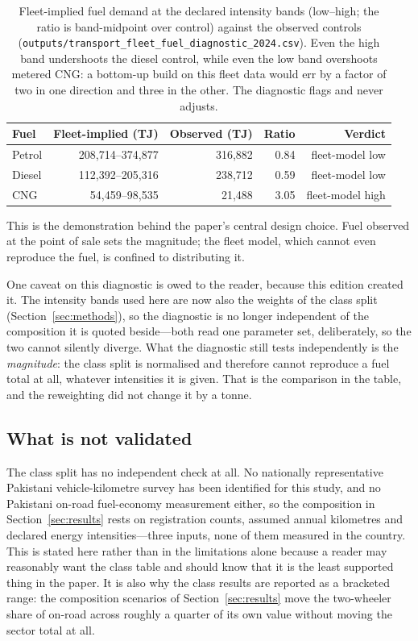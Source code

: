 \begin{table}[htbp]
\centering
\footnotesize
\begin{tabular}{@{}lrrrr@{}}
\toprule
\textbf{Fuel} & \textbf{Fleet-implied (TJ)} & \textbf{Observed (TJ)} &
\textbf{Ratio} & \textbf{Verdict} \\
\midrule
Petrol & 208,714--374,877 & 316,882 & 0.84 & fleet-model low \\
Diesel & 112,392--205,316 & 238,712 & 0.59 & fleet-model low \\
CNG    & 54,459--98,535   & 21,488  & 3.05 & fleet-model high \\
\bottomrule
\end{tabular}
\caption{Fleet-implied fuel demand at the declared intensity bands (low--high; the ratio
is band-midpoint over control) against the observed controls
(\texttt{outputs/transport\_fleet\_fuel\_diagnostic\_2024.csv}). Even the high band
undershoots the diesel control, while even the low band overshoots metered CNG: a
bottom-up build on this fleet data would err by a factor of two in one direction and
three in the other. The diagnostic flags and never adjusts.}
\label{tab:fuelgap}
\end{table}

This is the demonstration behind the paper's central design choice. Fuel observed at the
point of sale sets the magnitude; the fleet model, which cannot even reproduce the fuel,
is confined to distributing it.

One caveat on this diagnostic is owed to the reader, because this edition created it.
The intensity bands used here are now also the weights of the class split
(Section~\ref{sec:methods}), so the diagnostic is no longer independent of the
composition it is quoted beside---both read one parameter set, deliberately, so the two
cannot silently diverge. What the diagnostic still tests independently is the
\emph{magnitude}: the class split is normalised and therefore cannot reproduce a fuel
total at all, whatever intensities it is given. That is the comparison in the table, and
the reweighting did not change it by a tonne.

\subsection{What is not validated}

The class split has no independent check at all. No nationally representative Pakistani
vehicle-kilometre survey has been identified for this study, and no Pakistani on-road
fuel-economy measurement either, so the composition in Section~\ref{sec:results} rests on
registration counts, assumed annual kilometres and declared energy intensities---three
inputs, none of them measured in the country. This is stated here rather than in the
limitations alone because a reader may reasonably want the class table and should know
that it is the least supported thing in the paper. It is also why the class results are
reported as a bracketed range: the composition scenarios of
Section~\ref{sec:results} move the two-wheeler share of on-road \COtwo{} across roughly a
quarter of its own value without moving the sector total at all.

